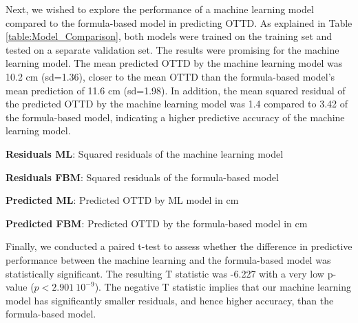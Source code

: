 \documentclass[11pt]{article}
\begin{document}
Next, we wished to explore the performance of a machine learning model compared to the formula-based model in predicting OTTD. As explained in Table {}\ref{table:Model_Comparison}, both models were trained on the training set and tested on a separate validation set. The results were promising for the machine learning model. The mean predicted OTTD by the machine learning model was 10.2 cm (sd=1.36), closer to the mean OTTD than the formula-based model's mean prediction of 11.6 cm (sd=1.98). In addition, the mean squared residual of the predicted OTTD by the machine learning model was 1.4 compared to 3.42 of the formula-based model, indicating a higher predictive accuracy of the machine learning model.

\begin{table}[h]
\caption{Predictive performance of the machine-learning model vs the formula-based model}
\label{table:Model_Comparison}
\begin{threeparttable}
\renewcommand{\TPTminimum}{\linewidth}
\begin{tablenotes}
\footnotesize
\item \textbf{Residuals ML}: Squared residuals of the machine learning model
\item \textbf{Residuals FBM}: Squared residuals of the formula-based model
\item \textbf{Predicted ML}: Predicted OTTD by ML model in cm
\item \textbf{Predicted FBM}: Predicted OTTD by the formula-based model in cm
\end{tablenotes}
\end{threeparttable}
\end{table}


Finally, we conducted a paired t-test to assess whether the difference in predictive performance between the machine learning and the formula-based model was statistically significant. The resulting T statistic was -6.227 with a very low p-value ($p<2.901\ 10^{-9}$). The negative T statistic implies that our machine learning model has significantly smaller residuals, and hence higher accuracy, than the formula-based model.
\end{document}
